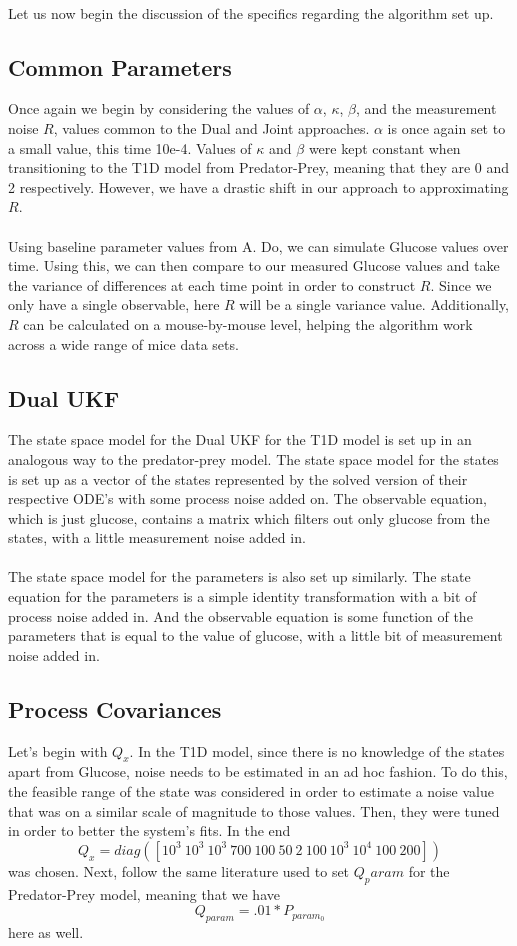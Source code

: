 \\
Let us now begin the discussion of the specifics regarding the algorithm set up.




\subsection{Common Parameters}
Once again we begin by considering the values of $\alpha$, $\kappa$, $\beta$, and the measurement noise $R$, values common to the Dual and Joint approaches. $\alpha$ is once again set to a small value, this time 10e-4. Values of $\kappa$ and $\beta$ were kept constant when transitioning to the T1D model from Predator-Prey, meaning that they are 0 and 2 respectively. However, we have a drastic shift in our approach to approximating $R$.\\
\\
Using baseline parameter values from A. Do, we can simulate Glucose values over time. Using this, we can then compare to our measured Glucose values and take the variance of differences at each time point in order to construct $R$. Since we only have a single observable, here $R$ will be a single variance value. Additionally, $R$ can be calculated on a mouse-by-mouse level, helping the algorithm work across a wide range of mice data sets.

\subsection{Dual UKF}
The state space model for the Dual UKF for the T1D model is set up in an analogous way to the predator-prey model. The state space model for the states is set up as a vector of the states represented by the solved version of their respective ODE's  with some process noise added on. The observable equation, which is just glucose, contains a matrix which filters out only glucose from the states, with a little measurement noise added in. \\
\\
The state space model for the parameters is also set up similarly. The state equation for the parameters is a simple identity transformation with a bit of process noise added in. And the observable equation is some function of the parameters that is equal to the value of glucose, with a little bit of measurement noise added in. 

\subsection{Process Covariances}
Let's begin with $Q_x$. In the T1D model, since there is no knowledge of the states apart from Glucose, noise needs to be estimated in an ad hoc fashion. To do this, the feasible range of the state was considered in order to estimate a noise value that was on a similar scale of magnitude to those values. Then, they were tuned in order to better the system's fits. In the end
$$Q_x = diag([10^3 \ 10^3 \ 10^3 \ 700 \ 100 \ 50 \ 2 \ 100 \ 10^3 \ 10^4 \ 100 \ 200])$$
was chosen. Next, follow the same literature used to set $Q_param$ for the Predator-Prey model, meaning that we have
$$ Q_{param} = .01 * P_{param_0} $$ 
here as well.

